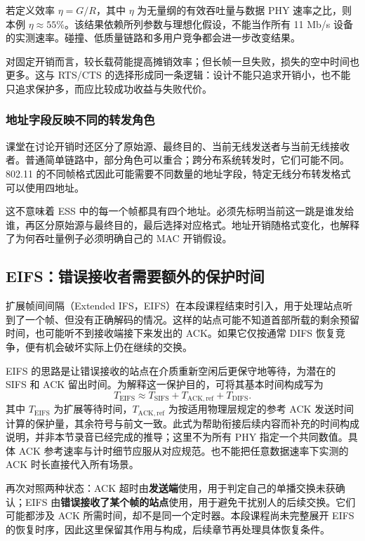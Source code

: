 若定义效率 $\eta=G/R$，其中 $\eta$ 为无量纲的有效吞吐量与数据 PHY 速率之比，则本例 $\eta\approx55\%$。该结果依赖所列参数与理想化假设，不能当作所有 11 Mb/s 设备的实测速率。碰撞、低质量链路和多用户竞争都会进一步改变结果。

对固定开销而言，较长载荷能提高摊销效率；但长帧一旦失败，损失的空中时间也更多。这与 RTS/CTS 的选择形成同一条逻辑：设计不能只追求开销小，也不能只追求保护多，而应比较成功收益与失败代价。

\subsubsection{地址字段反映不同的转发角色}

课堂在讨论开销时还区分了原始源、最终目的、当前无线发送者与当前无线接收者。普通简单链路中，部分角色可以重合；跨分布系统转发时，它们可能不同。802.11 的不同帧格式因此可能需要不同数量的地址字段，特定无线分布转发格式可以使用四地址。

这不意味着 ESS 中的每一个帧都具有四个地址。必须先标明当前这一跳是谁发给谁，再区分原始源与最终目的，最后选择对应格式。地址开销随格式变化，也解释了为何吞吐量例子必须明确自己的 MAC 开销假设。

\subsection{EIFS：错误接收者需要额外的保护时间}

扩展帧间间隔（Extended IFS，EIFS）在本段课程结束时引入，用于处理站点听到了一个帧、但没有正确解码的情况。这样的站点可能不知道首部所载的剩余预留时间，也可能听不到接收端接下来发出的 ACK。如果它仅按通常 DIFS 恢复竞争，便有机会破坏实际上仍在继续的交换。

EIFS 的思路是让错误接收的站点在介质重新空闲后更保守地等待，为潜在的 SIFS 和 ACK 留出时间。为解释这一保护目的，可将其基本时间构成写为
\begin{equation}
T_{\mathrm{EIFS}}\approx T_{\mathrm{SIFS}}+T_{\mathrm{ACK,ref}}+T_{\mathrm{DIFS}}.
\label{eq:eifs-intro}
\end{equation}
其中 $T_{\mathrm{EIFS}}$ 为扩展等待时间，$T_{\mathrm{ACK,ref}}$ 为按适用物理层规定的参考 ACK 发送时间计算的保护量，其余符号与前文一致。此式为帮助衔接后续内容而补充的时间构成说明，并非本节录音已经完成的推导；这里不为所有 PHY 指定一个共同数值。具体 ACK 参考速率与计时细节应服从对应规范。也不能把任意数据速率下实测的 ACK 时长直接代入所有场景。

再次对照两种状态：ACK 超时由\textbf{发送端}使用，用于判定自己的单播交换未获确认；EIFS 由\textbf{错误接收了某个帧的站点}使用，用于避免干扰别人的后续交换。它们可能都涉及 ACK 所需时间，却不是同一个定时器。本段课程尚未完整展开 EIFS 的恢复时序，因此这里保留其作用与构成，后续章节再处理具体恢复条件。

